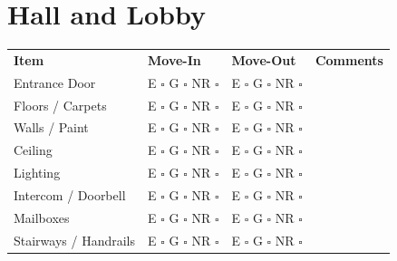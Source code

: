 
\section*{Hall and Lobby}
\label{sec:hall}

\begin{longtable}{p{6cm} p{3cm} p{3cm} p{4cm}}
\textbf{Item} & \textbf{Move-In} & \textbf{Move-Out} & \textbf{Comments} \\
Entrance Door & E $\square$ G $\square$ NR $\square$ & E $\square$ G $\square$ NR $\square$ & \\
Floors / Carpets & E $\square$ G $\square$ NR $\square$ & E $\square$ G $\square$ NR $\square$ & \\
Walls / Paint & E $\square$ G $\square$ NR $\square$ & E $\square$ G $\square$ NR $\square$ & \\
Ceiling & E $\square$ G $\square$ NR $\square$ & E $\square$ G $\square$ NR $\square$ & \\
Lighting & E $\square$ G $\square$ NR $\square$ & E $\square$ G $\square$ NR $\square$ & \\
Intercom / Doorbell & E $\square$ G $\square$ NR $\square$ & E $\square$ G $\square$ NR $\square$ & \\
Mailboxes & E $\square$ G $\square$ NR $\square$ & E $\square$ G $\square$ NR $\square$ & \\
Stairways / Handrails & E $\square$ G $\square$ NR $\square$ & E $\square$ G $\square$ NR $\square$ & \\
\end{longtable}

